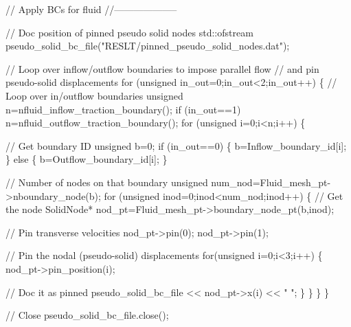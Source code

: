 \begin{DoxyCodeInclude}



 
 \textcolor{comment}{// Apply BCs for fluid}
 \textcolor{comment}{//--------------------}
  
 \textcolor{comment}{// Doc position of pinned pseudo solid nodes}
 std::ofstream pseudo\_solid\_bc\_file(\textcolor{stringliteral}{"RESLT/pinned\_pseudo\_solid\_nodes.dat"});
 
 \textcolor{comment}{// Loop over inflow/outflow boundaries to impose parallel flow}
 \textcolor{comment}{// and pin pseudo-solid displacements}
 \textcolor{keywordflow}{for} (\textcolor{keywordtype}{unsigned} in\_out=0;in\_out<2;in\_out++)
  \{
   \textcolor{comment}{// Loop over in/outflow boundaries}
   \textcolor{keywordtype}{unsigned} n=nfluid\_inflow\_traction\_boundary();
   \textcolor{keywordflow}{if} (in\_out==1) n=nfluid\_outflow\_traction\_boundary();
   \textcolor{keywordflow}{for} (\textcolor{keywordtype}{unsigned} i=0;i<n;i++)
    \{

     \textcolor{comment}{// Get boundary ID}
     \textcolor{keywordtype}{unsigned} b=0;
     \textcolor{keywordflow}{if} (in\_out==0)
      \{
       b=Inflow\_boundary\_id[i];
      \}
     \textcolor{keywordflow}{else}
      \{
       b=Outflow\_boundary\_id[i];
      \}

     \textcolor{comment}{// Number of nodes on that boundary}
     \textcolor{keywordtype}{unsigned} num\_nod=Fluid\_mesh\_pt->nboundary\_node(b);
     \textcolor{keywordflow}{for} (\textcolor{keywordtype}{unsigned} inod=0;inod<num\_nod;inod++)
      \{
       \textcolor{comment}{// Get the node}
       SolidNode* nod\_pt=Fluid\_mesh\_pt->boundary\_node\_pt(b,inod);
       
       \textcolor{comment}{// Pin transverse velocities}
       nod\_pt->pin(0);
       nod\_pt->pin(1);
       
       \textcolor{comment}{// Pin the nodal (pseudo-solid) displacements}
       \textcolor{keywordflow}{for}(\textcolor{keywordtype}{unsigned} i=0;i<3;i++)
        \{         
         nod\_pt->pin\_position(i);         
         
         \textcolor{comment}{// Doc it as pinned}
         pseudo\_solid\_bc\_file << nod\_pt->x(i) << \textcolor{stringliteral}{" "};
        \}
      \}
    \}
  \}
 
 \textcolor{comment}{// Close}
 pseudo\_solid\_bc\_file.close();

\end{DoxyCodeInclude}


